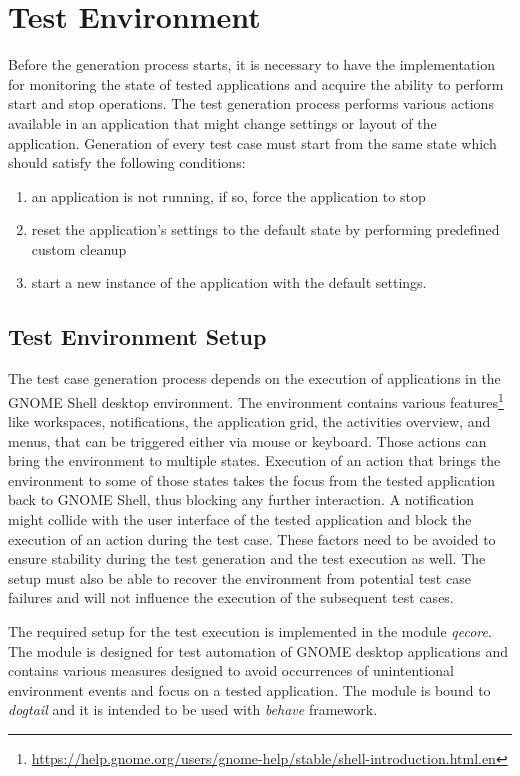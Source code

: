 \section{Test Environment}
Before the generation process starts, it is necessary to have the implementation for monitoring the state of tested applications and acquire the ability to perform start and stop operations. The test generation process performs various actions available in an application that might change settings or layout of the application. Generation of every test case must start from the same state which should satisfy the following conditions: 
\begin{enumerate}
    \item an application is not running, if so, force the application to stop
    \item reset the application's settings to the default state by performing predefined custom cleanup
    \item start a new instance of the application with the default settings.
\end{enumerate}

\subsection{Test Environment Setup}
The test case generation process depends on the execution of applications in the GNOME Shell desktop environment. The environment contains various features\footnote{\url{https://help.gnome.org/users/gnome-help/stable/shell-introduction.html.en}} like workspaces, notifications, the application grid, the activities overview, and menus, that can be triggered either via mouse or keyboard. Those actions can bring the environment to multiple states. Execution of an action that brings the environment to some of those states takes the focus from the tested application back to GNOME Shell, thus blocking any further interaction. A notification might collide with the user interface of the tested application and block the execution of an action during the test case. These factors need to be avoided to ensure stability during the test generation and the test execution as well. The setup must also be able to recover the environment from potential test case failures and will not influence the execution of the subsequent test cases. 

The required setup for the test execution is implemented in the module \textit{qecore}. The module is designed for test automation of GNOME desktop applications and contains various measures designed to avoid occurrences of unintentional environment events and focus on a tested application. The module is bound to \textit{dogtail} and it is intended to be used with \textit{behave} framework.\cite{qecore} 

